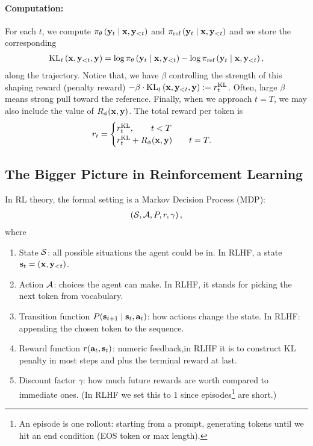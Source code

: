 \documentclass[11pt]{article}  %
\begin{document}
\paragraph{Computation:} For each $t$, we compute $\pi_{\theta}\left( \mathbf{y}_t \mid \mathbf{x}, \mathbf{y}_{<t} \right)$ and $\pi_{\text{ref}}\left( \mathbf{y}_t \mid \mathbf{x}, \mathbf{y}_{<t} \right)$ and we store the corresponding 
\begin{align*}
  \text{KL}_t \left( \mathbf{x}, \mathbf{y}_{<t}, \mathbf{y} \right) = \log \pi_{\theta}\left( \mathbf{y}_t \mid \mathbf{x}, \mathbf{y}_{<t} \right) - \log \pi_{\text{ref}}\left( \mathbf{y}_t \mid \mathbf{x}, \mathbf{y}_{<t} \right),
\end{align*}
along the trajectory. 
Notice that, we have $\beta$ controlling the strength of this shaping reward (penalty reward) $-\beta \cdot \text{KL}_t \left( \mathbf{x}, \mathbf{y}_{<t}, \mathbf{y} \right) := r_t^{\text{KL}}$.
Often, large $\beta$ means strong pull toward the reference.
Finally, when we approach $t = T$, we may also include the value of $R_{\phi}(\mathbf{x}, \mathbf{y})$. 
The total reward per token is
\begin{align*}
  r_t = \begin{cases}
    r_t^{\text{KL}}, \qquad t < T \\
    r_t^{\text{KL}} + R_{\phi}(\mathbf{x}, \mathbf{y}) \qquad t = T.    
  \end{cases}
\end{align*}


\subsection{The Bigger Picture in Reinforcement Learning}
In RL theory, the formal setting is a Markov Decision Process (MDP):
\begin{align*}
  \left( \mathcal{S}, \mathcal{A}, P, r, \gamma \right),
\end{align*}
where 
\begin{enumerate}
  \item State $\mathcal{S}$: all possible situations the agent could be in.
  In RLHF, a state $\mathbf{s}_t = (\mathbf{x}, \mathbf{y}_{<t})$.
  \item Action $\mathcal{A}$: choices the agent can make.
  In RLHF, it stands for picking the next token from vocabulary.
  \item Transition function $P(\mathbf{s}_{t+1} \mid \mathbf{s}_t, \mathbf{a}_t)$: how actions change the state.
  In RLHF: appending the chosen token to the sequence.
  \item Reward function $r(\mathbf{a}_t, \mathbf{s}_t)$: numeric feedback,in RLHF it is to construct KL penalty in most steps and plus the terminal reward at last.
  \item Discount factor $\gamma$: how much future rewards are worth compared to immediate ones. (In RLHF we set this to $1$ since episodes\footnote{An episode is one rollout: starting from a prompt, generating tokens until we hit an end condition (EOS token or max length).} are short.) 
\end{enumerate}
\end{document}

